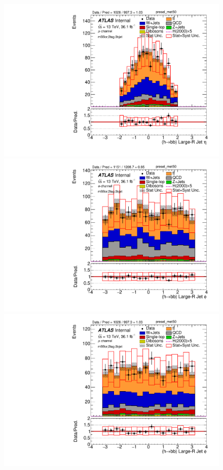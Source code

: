 \begin{figure}[!h]
\begin{center}
\includegraphics[scale=0.33]{./figures/boosted/PlotByChannels/DataMC_2tag_0bjet_mbbcr_muon_presel_met50_HbbEta}                                                              
\includegraphics[scale=0.33]{./figures/boosted/PlotByChannels/DataMC_2tag_0bjet_mbbcr_elec_presel_met50_HbbPhi}                                                              
\includegraphics[scale=0.33]{./figures/boosted/PlotByChannels/DataMC_2tag_0bjet_mbbcr_muon_presel_met50_HbbPhi}                                                              

\end{center}
\end{figure}
